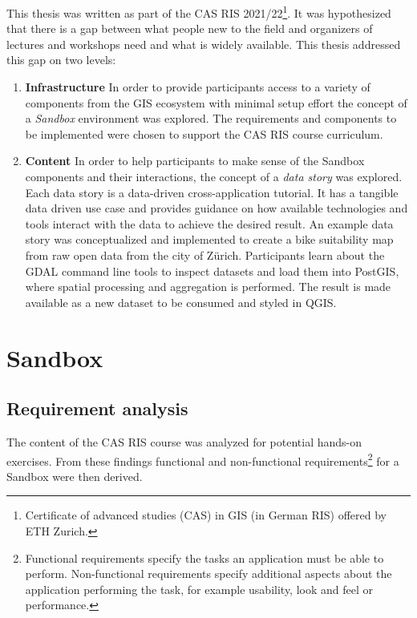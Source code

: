 \documentclass[11pt, a4paper, oneside, parskip=full-]{scrartcl}
\begin{document}
This thesis was written as part of the CAS RIS 2021/22\footnote{Certificate of
advanced studies (CAS) in GIS (in German RIS) offered by ETH Zurich.}. It was
hypothesized that there is a gap between what people new to the field and
organizers of lectures and workshops need and what is widely available. This
thesis addressed this gap on two levels:
\begin{enumerate}
  \item \textbf{Infrastructure} In order to provide participants access to a
  variety of components from the GIS ecosystem with minimal setup effort the
  concept of a \emph{Sandbox} environment was explored. The requirements and
  components to be implemented were chosen to support the CAS RIS course
  curriculum.
  \item \textbf{Content} In order to help participants to make sense of the
  Sandbox components and their interactions, the concept of a \emph{data story}
  was explored. Each data story is a data-driven cross-application tutorial. It
  has a tangible data driven use case and provides guidance on how available
  technologies and tools interact with the data to achieve the desired result.
  An example data story was conceptualized and implemented to create a bike
  suitability map from raw open data from the city of Zürich. Participants learn
  about the GDAL command line tools to inspect datasets and load them into
  PostGIS, where spatial processing and aggregation is performed. The result is
  made available as a new dataset to be consumed and styled in QGIS.
\end{enumerate}


\section{Sandbox}

\subsection{Requirement analysis} \label{sectionrequirements}

The content of the CAS RIS course was analyzed for potential hands-on exercises.
From these findings functional and non-functional
requirements\footnote{Functional requirements specify the tasks an application
must be able to perform. Non-functional requirements specify additional aspects
about the application performing the task, for example usability, look and feel
or performance. } for a Sandbox were then derived.
\end{document}
